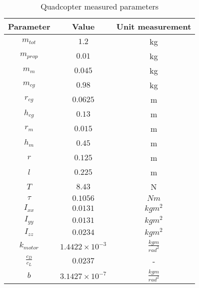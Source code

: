 \begin{table}[h]
\centering
\caption{Quadcopter measured parameters}
\label{tab:param}
\begin{tabular}{c|c|c}
\textbf{Parameter} & \textbf{\ \ \ Value\ \ \ } & \textbf{Unit measurement} \\
\hline
$m_{tot}$ & $1.2$ &  kg\\
$m_{prop}$ & $0.01$ & kg\\
$m_m$ & $0.045$ & kg \\
$m_{cg}$ & $0.98$ & kg \\
$r_{cg}$ & $0.0625$ & m \\
$h_{cg}$ & $0.13$ & m \\
$r_m$ & $0.015$ &  m\\
$h_m$ & $0.45$ &  m\\
$r$ & $0.125$ &  m\\
$l$ & $0.225$ &  m\\
$T$ & $8.43$ &  N\\
$\tau$ & $0.1056$ &  $Nm$\\
$I_{xx}$ & $0.0131$ &  $kg m^2$\\
$I_{yy}$ & $0.0131$ &  $kg m^2$\\
$I_{zz}$ & $0.0234$ &  $kg m^2$\\
$k_{motor}$ & $1.4422\times10^{-3}$ &  $\frac{kg m}{rad^2}$\\
$\frac{c_D}{c_L}$ & $0.0237$ &  -\\
$b$ & $3.1427\times10^{-7}$ &  $\frac{kg m}{rad^2}$\\
\end{tabular}
\end{table} 